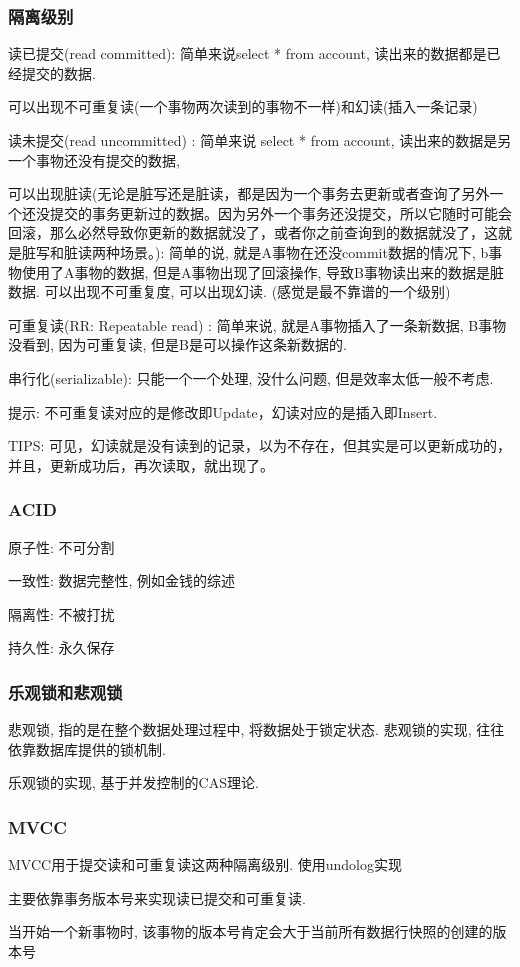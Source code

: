 \documentclass[UTF8]{ctexart}
\begin{document}
\subsubsection{隔离级别}
\par
读已提交(read committed): 简单来说select * from account, 读出来的数据都是已经提交的数据.
\par 可以出现不可重复读(一个事物两次读到的事物不一样)和幻读(插入一条记录)
\par
读未提交(read uncommitted) : 简单来说 select * from account, 读出来的数据是另一个事物还没有提交的数据,
\par 可以出现脏读(无论是脏写还是脏读，都是因为一个事务去更新或者查询了另外一个还没提交的事务更新过的数据。因为另外一个事务还没提交，所以它随时可能会回滚，那么必然导致你更新的数据就没了，或者你之前查询到的数据就没了，这就是脏写和脏读两种场景。): 简单的说, 就是A事物在还没commit数据的情况下, b事物使用了A事物的数据, 但是A事物出现了回滚操作, 导致B事物读出来的数据是脏数据. 可以出现不可重复度, 可以出现幻读. (感觉是最不靠谱的一个级别)
\par
可重复读(RR: Repeatable read) : 简单来说, 就是A事物插入了一条新数据, B事物没看到, 因为可重复读, 但是B是可以操作这条新数据的.
\par
串行化(serializable): 只能一个一个处理, 没什么问题, 但是效率太低一般不考虑.
\par 提示: 不可重复读对应的是修改即Update，幻读对应的是插入即Insert.
\par TIPS:
可见，幻读就是没有读到的记录，以为不存在，但其实是可以更新成功的，并且，更新成功后，再次读取，就出现了。
\subsubsection{ACID}
原子性: 不可分割
\par
一致性: 数据完整性, 例如金钱的综述
\par
隔离性: 不被打扰
\par
持久性: 永久保存
\subsubsection{乐观锁和悲观锁}
悲观锁, 指的是在整个数据处理过程中, 将数据处于锁定状态. 悲观锁的实现, 往往依靠数据库提供的锁机制.
\par
乐观锁的实现, 基于并发控制的CAS理论.
\subsubsection{MVCC}
MVCC用于提交读和可重复读这两种隔离级别. 使用undolog实现
\par
主要依靠事务版本号来实现读已提交和可重复读.
\par
当开始一个新事物时, 该事物的版本号肯定会大于当前所有数据行快照的创建的版本号
\end{document}
